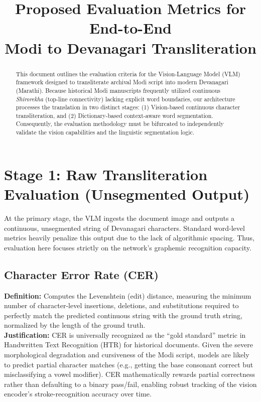\documentclass[journal, onecolumn]{IEEEtran}
\begin{document}
\title{Proposed Evaluation Metrics for End-to-End\\ Modi to Devanagari Transliteration}
\author{}
\maketitle

\begin{abstract}
This document outlines the evaluation criteria for the Vision-Language Model (VLM) framework designed to transliterate archival Modi script into modern Devanagari (Marathi). Because historical Modi manuscripts frequently utilized continuous \textit{Shirorekha} (top-line connectivity) lacking explicit word boundaries, our architecture processes the translation in two distinct stages: (1) Vision-based continuous character transliteration, and (2) Dictionary-based context-aware word segmentation. Consequently, the evaluation methodology must be bifurcated to independently validate the vision capabilities and the linguistic segmentation logic.
\end{abstract}

\section{Stage 1: Raw Transliteration Evaluation (Unsegmented Output)}
At the primary stage, the VLM ingests the document image and outputs a continuous, unsegmented string of Devanagari characters. Standard word-level metrics heavily penalize this output due to the lack of algorithmic spacing. Thus, evaluation here focuses strictly on the network's graphemic recognition capacity.

\subsection{Character Error Rate (CER)}
\textbf{Definition:} Computes the Levenshtein (edit) distance, measuring the minimum number of character-level insertions, deletions, and substitutions required to perfectly match the predicted continuous string with the ground truth string, normalized by the length of the ground truth.
\\[5pt]
\textbf{Justification:} CER is universally recognized as the ``gold standard'' metric in Handwritten Text Recognition (HTR) for historical documents. Given the severe morphological degradation and cursiveness of the Modi script, models are likely to predict partial character matches (e.g., getting the base consonant correct but misclassifying a vowel modifier). CER mathematically rewards partial correctness rather than defaulting to a binary pass/fail, enabling robust tracking of the vision encoder's stroke-recognition accuracy over time.
\end{document}
